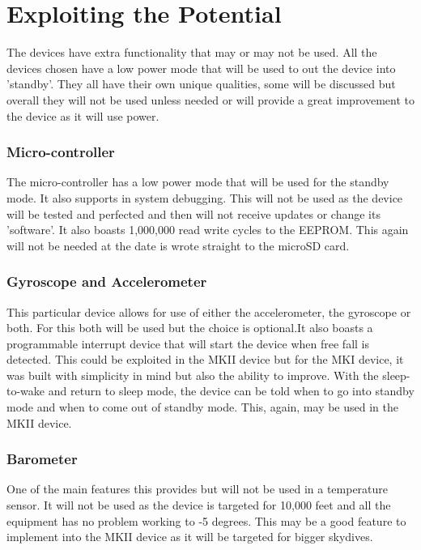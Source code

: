\documentclass{report}
\begin{document}
\section{Exploiting the Potential}
 
 The devices have extra functionality that may or may not be used. All the devices chosen have a low power mode that will be used to out the device into 'standby'. They all have their own unique qualities, some will be discussed but overall they will not be used unless needed or will provide a great improvement to the device as it will use power.
 
\subsubsection{Micro-controller}
The micro-controller has a low power mode that will be used for the standby mode. It also supports in system debugging. This will not be used as the device will be tested and perfected and then will not receive updates or change its 'software'.  It also boasts 1,000,000 read write cycles to the EEPROM. This again will not be needed at the date is wrote straight to the microSD card.

\subsubsection{Gyroscope and Accelerometer}
This particular device allows for use of either the accelerometer, the gyroscope or both. For this both will be used but the choice is optional.It also boasts a programmable interrupt device that will start the device when free fall is detected. This could be exploited in the MKII device but for the MKI device, it was built with simplicity in mind but also the ability to improve. With the sleep-to-wake and return to sleep mode, the device can be told when to go into standby mode and when to come out of standby mode. This, again, may be used in the MKII device. 

\subsubsection{Barometer}
One of the main features this provides but will not be used in a temperature sensor. It will not be used as the device is targeted for 10,000 feet and all the equipment has no problem working to -5 degrees. This may be a good feature to implement into the MKII device as it will be targeted for bigger skydives.
  
\end{document}
